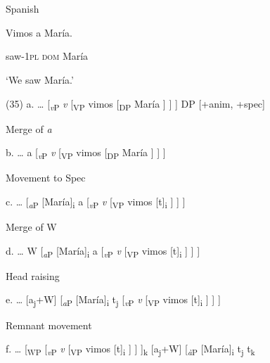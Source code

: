 \documentclass[output=paper]{langsci/langscibook}
\begin{document}
\begin{styleHTMLPreformatted}
\ea%
    \label{ex:key:34}
    \gll\\
        \\
    \glt
    \z

           Spanish
\end{styleHTMLPreformatted}

\begin{styleHTMLPreformatted}
  Vimos     a          María.            
\end{styleHTMLPreformatted}

\begin{styleHTMLPreformatted}
  saw{}-\textsc{1pl  dom}   María
\end{styleHTMLPreformatted}

\begin{styleHTMLPreformatted}
  ‘We saw María.’
\end{styleHTMLPreformatted}

 (35)  a.  …  [\textit{\textsubscript{v}}\textsubscript{P}  \textit{v}  [\textsubscript{VP} vimos   [\textsubscript{DP} María ] ] ]    DP [+anim, +spec]

  Merge of \textit{a}

b.  …  a  [\textit{\textsubscript{v}}\textsubscript{P}  \textit{v}  [\textsubscript{VP} vimos   [\textsubscript{DP} María ] ] ]

  Movement to Spec 

c.  …  [\textit{\textsubscript{a}}\textsubscript{P} [María]\textsubscript{i}  a  [\textit{\textsubscript{v}}\textsubscript{P}  \textit{v}  [\textsubscript{VP} vimos [t]\textsubscript{i} ] ] ]  

  Merge of W 

d.  …  W [\textit{\textsubscript{a}}\textsubscript{P} [María]\textsubscript{i}  a  [\textit{\textsubscript{v}}\textsubscript{P}  \textit{v}  [\textsubscript{VP} vimos [t]\textsubscript{i} ] ] ]  

  Head raising 

e.  …  [a\textsubscript{j}+W] [\textit{\textsubscript{a}}\textsubscript{P} [María]\textsubscript{i}  t\textsubscript{j}  [\textit{\textsubscript{v}}\textsubscript{P}  \textit{v}  [\textsubscript{VP} vimos [t]\textsubscript{i} ] ] ]  

  Remnant movement 

f.  …  [\textsubscript{WP}  [\textit{\textsubscript{v}}\textsubscript{P}  \textit{v}  [\textsubscript{VP} vimos [t]\textsubscript{i} ] ] ]\textsubscript{k} [a\textsubscript{j}+W] [\textit{\textsubscript{à}}\textsubscript{P} [María]\textsubscript{i}  t\textsubscript{j}  t\textsubscript{k}  
\end{document}

